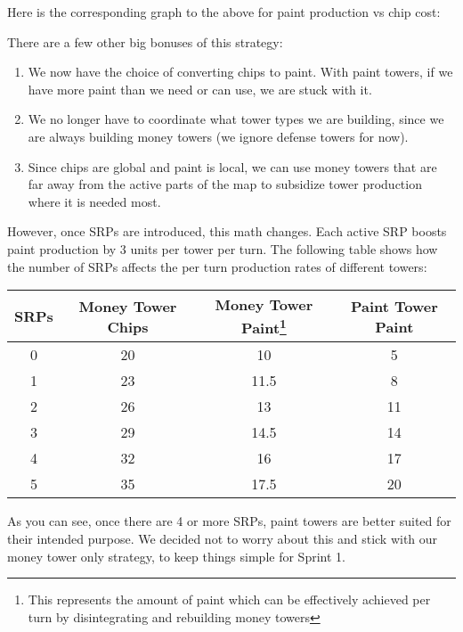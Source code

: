 \documentclass{article}
\begin{document}
  \medskip

  Here is the corresponding graph to the above for paint production vs chip cost:
  \begin{center}
  \end{center}
  There are a few other big bonuses of this strategy:
  \begin{enumerate}
    \item We now have the choice of converting chips to paint. With paint towers, if we have more paint than we need or can use, we are stuck with it.
    \item We no longer have to coordinate what tower types we are building, since we are always building money towers (we ignore defense towers for now).
    \item Since chips are global and paint is local, we can use money towers that are far away from the active parts of the map to subsidize tower production where it is needed most.
  \end{enumerate}
  However, once SRPs are introduced, this math changes. Each active SRP boosts paint production by 3 units per tower per turn. The following table shows how the number of SRPs affects the per turn production rates of different towers:
  \begin{center}
    \begin{tabular}{c | c | c | c}
      SRPs & Money Tower Chips & Money Tower Paint\footnote{This represents the amount of paint which can be effectively achieved per turn by disintegrating and rebuilding money towers} & Paint Tower Paint \\
      \hline
      0 & 20 & 10 & 5 \\
      1 & 23 & 11.5 & 8 \\
      2 & 26 & 13 & 11 \\
      3 & 29 & 14.5 & 14 \\
      4 & 32 & 16 & 17 \\
      5 & 35 & 17.5 & 20
    \end{tabular}
  \end{center}
  As you can see, once there are 4 or more SRPs, paint towers are better suited for their intended purpose. We decided not to worry about this and stick with our money tower only strategy, to keep things simple for Sprint 1.
\end{document}

